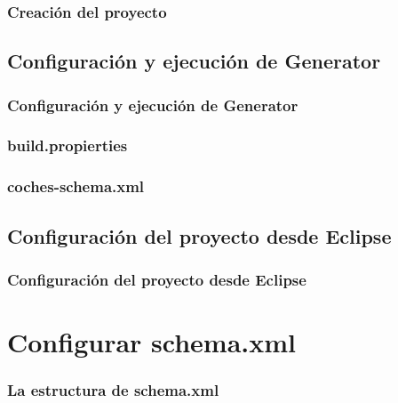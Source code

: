 \documentclass[24pt, a4paper, oneside, spanish]{beamer}
\begin{document}
\begin{frame}[allowframebreaks]
	\frametitle{Creación del proyecto}
	
	
\end{frame}

\subsection{Configuración y ejecución de Generator}
\begin{frame}
	\frametitle{Configuración y ejecución de Generator}
	
	
\end{frame}

\begin{frame}
	\frametitle{build.propierties}
	
	
\end{frame}

\begin{frame}
	\frametitle{coches-schema.xml}

	
\end{frame}

\subsection{Configuración del proyecto desde Eclipse}
\begin{frame}
	\frametitle{Configuración del proyecto desde Eclipse}
	
	
\end{frame}

\section{Configurar schema.xml}
	\begin{frame}[allowframebreaks]
		\frametitle{La estructura de schema.xml}
		
		
	\end{frame}	
	
\end{document}
